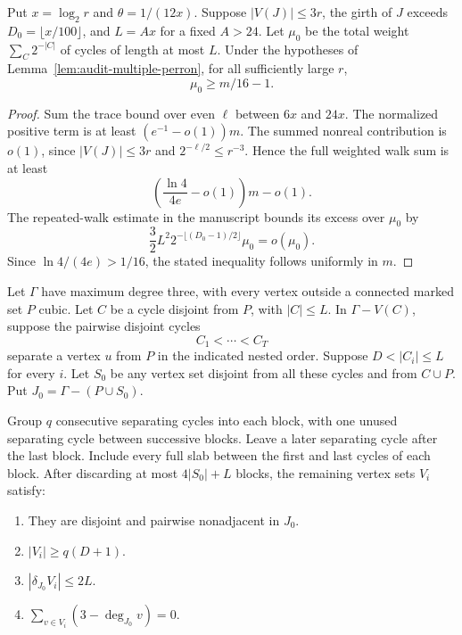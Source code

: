 \begin{corollary}
\label{cor:audit-test-set-cycle-weight}
Put $x=\log_2r$ and $\theta=1/(12x)$.
Suppose $|V(J)|\le3r$, the girth of $J$ exceeds $D_0=\lfloor x/100\rfloor$, and $L=Ax$ for a fixed $A>24$.
Let $\mu_0$ be the total weight $\sum_C2^{-|C|}$ of cycles of length at most $L$.
Under the hypotheses of Lemma~\ref{lem:audit-multiple-perron}, for all sufficiently large $r$,
\[
 \mu_0\ge m/16-1.
\]
\end{corollary}

\begin{proof}
Sum the trace bound over even $\ell$ between $6x$ and $24x$.
The normalized positive term is at least $(e^{-1}-o(1))m$.
The summed nonreal contribution is $o(1)$, since $|V(J)|\le3r$ and $2^{-\ell/2}\le r^{-3}$.
Hence the full weighted walk sum is at least
\[
 \left(\frac{\ln4}{4e}-o(1)\right)m-o(1).
\]
The repeated-walk estimate in the manuscript bounds its excess over $\mu_0$ by
\[
 \frac32L^2 2^{-\lfloor(D_0-1)/2\rfloor}\mu_0=o(\mu_0).
\]
Since $\ln4/(4e)>1/16$, the stated inequality follows uniformly in $m$.
\end{proof}

\begin{lemma}
\label{lem:audit-clean-restored-blocks}
Let $\Gamma$ have maximum degree three, with every vertex outside a connected marked set $P$ cubic.
Let $C$ be a cycle disjoint from $P$, with $|C|\le L$.
In $\Gamma-V(C)$, suppose the pairwise disjoint cycles
\[
 C_1<\cdots<C_T
\]
separate a vertex $u$ from $P$ in the indicated nested order.
Suppose $D<|C_i|\le L$ for every $i$.
Let $S_0$ be any vertex set disjoint from all these cycles and from $C\cup P$.
Put $J_0=\Gamma-(P\cup S_0)$.

Group $q$ consecutive separating cycles into each block, with one unused separating cycle between successive blocks.
Leave a later separating cycle after the last block.
Include every full slab between the first and last cycles of each block.
After discarding at most $4|S_0|+L$ blocks, the remaining vertex sets $V_i$ satisfy:
\begin{enumerate}
\item They are disjoint and pairwise nonadjacent in $J_0$.
\item $|V_i|\ge q(D+1)$.
\item $|\delta_{J_0}V_i|\le2L$.
\item $\sum_{v\in V_i}(3-\deg_{J_0}v)=0$.
\end{enumerate}
\end{lemma}

